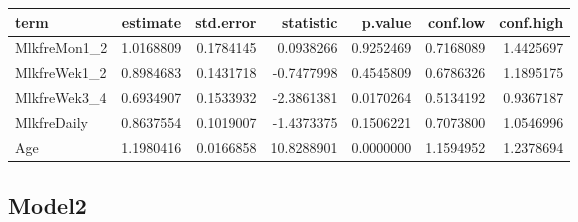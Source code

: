 \documentclass[]{article}
\newenvironment{Shaded}{\begin{snugshade}}{\end{snugshade}}
\newcommand{\DataTypeTok}[1]{\textcolor[rgb]{0.13,0.29,0.53}{#1}}
\newcommand{\KeywordTok}[1]{\textcolor[rgb]{0.13,0.29,0.53}{\textbf{#1}}}
\newcommand{\NormalTok}[1]{#1}
\newcommand{\OperatorTok}[1]{\textcolor[rgb]{0.81,0.36,0.00}{\textbf{#1}}}
\newcommand{\OtherTok}[1]{\textcolor[rgb]{0.56,0.35,0.01}{#1}}
\newcommand{\StringTok}[1]{\textcolor[rgb]{0.31,0.60,0.02}{#1}}
\begin{document}
\begin{longtable}[]{@{}lrrrrrr@{}}
\toprule
term & estimate & std.error & statistic & p.value & conf.low &
conf.high\tabularnewline
\midrule
\endhead
MlkfreMon1\_2 & 1.0168809 & 0.1784145 & 0.0938266 & 0.9252469 &
0.7168089 & 1.4425697\tabularnewline
MlkfreWek1\_2 & 0.8984683 & 0.1431718 & -0.7477998 & 0.4545809 &
0.6786326 & 1.1895175\tabularnewline
MlkfreWek3\_4 & 0.6934907 & 0.1533932 & -2.3861381 & 0.0170264 &
0.5134192 & 0.9367187\tabularnewline
MlkfreDaily & 0.8637554 & 0.1019007 & -1.4373375 & 0.1506221 & 0.7073800
& 1.0546996\tabularnewline
Age & 1.1980416 & 0.0166858 & 10.8288901 & 0.0000000 & 1.1594952 &
1.2378694\tabularnewline
\bottomrule
\end{longtable}

\hypertarget{model2-9}{%
\subsection{Model2}\label{model2-9}}

\begin{Shaded}
\end{Shaded}
\end{document}
